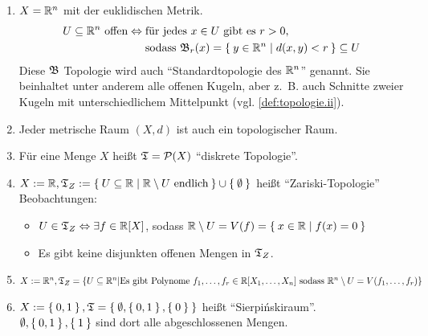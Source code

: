 \begin{beispiel}[Topologien]
    \begin{enumerate}[label=\arabic*)]
        \item $X = \mathbb{R}^n$ mit der euklidischen Metrik. 
              \begin{align*}
                U \subseteq \mathbb{R}^n \text{ offen} \Leftrightarrow\;&\text{für jedes $x \in U$ gibt es $r > 0$,}\\
                                                       &\text{sodass $\mathfrak{B}_r(x) = \Set{y \in \ensuremath{\mathbb{R}}^n | d(x,y) < r} \subseteq U$}
              \end{align*}
              Diese $\mathfrak{B}$ Topologie wird auch \enquote{Standardtopologie des $\mathbb{R}^n$} genannt.
              Sie beinhaltet unter anderem alle offenen Kugeln, aber
              z.~B. auch Schnitte zweier Kugeln mit unterschiedlichem
              Mittelpunkt (vgl. \cref{def:topologie.ii}).
        \item Jeder metrische Raum $(X, d)$ ist auch ein topologischer Raum.
        \item Für eine Menge $X$ heißt $\mathfrak{T} = \mathcal{P}(X)$ \enquote{diskrete Topologie}.
        \item $X :=\mathbb{R}, \mathfrak{T}_Z := \Set{U \subseteq \ensuremath{\mathbb{R}}| \ensuremath{\mathbb{R}}\setminus U \text{ endlich}} \cup \Set{\emptyset}$ heißt \enquote{Zariski-Topologie} \\
              Beobachtungen: 
            \begin{itemize}
                \item $U \in \mathfrak{T}_Z \Leftrightarrow \exists f \in \mathbb{R}[X]$, sodass $\mathbb{R} \setminus U = V(f) = \Set{x \in \ensuremath{\mathbb{R}}| f(x) = 0}$
                \item Es gibt keine disjunkten offenen Mengen in $\mathfrak{T}_Z$.
            \end{itemize}
        \item $X := \mathbb{R}^n, \mathfrak{T}_Z = \{U \subseteq \mathbb{R}^n | \text{Es gibt Polynome } f_1, \dots, f_r \in \mathbb{R}[X_1, \dots, X_n] \text{ sodass }\\\mathbb{R}^n \setminus U = V(f_1, \dots, f_r)\}$
        \item $X := \Set{0,1}, \mathfrak{T} = \Set{\emptyset, \Set{0,1}, \Set{0}}$ heißt \enquote{Sierpińskiraum}.\\
              $\emptyset, \Set{0,1}, \Set{1}$ sind dort alle abgeschlossenen Mengen.
    \end{enumerate}
\end{beispiel}

